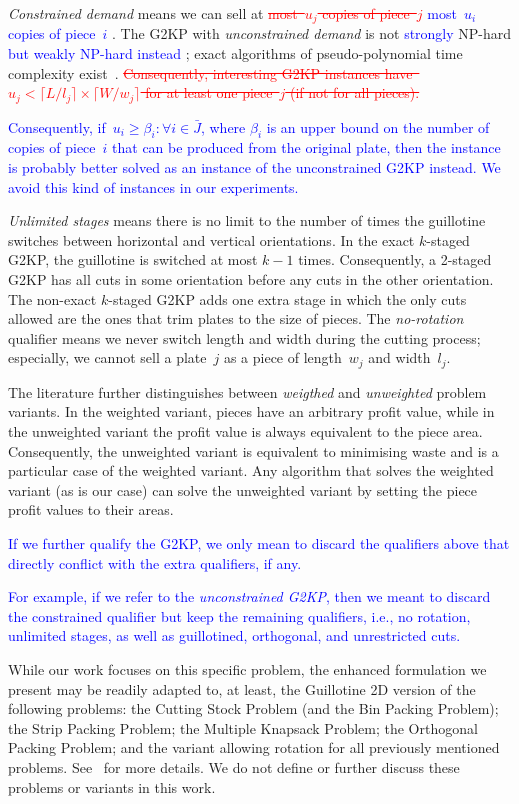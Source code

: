 \documentclass[smallextended]{svjour3}       %
\newif\iffinalversion
\newcommand{\newtext}[1]{\iffinalversion%
#1%
\else%
\textcolor{blue}{#1}%
\fi%
}
\newcommand{\oldtext}[1]{\iffinalversion%
#1%
\else%
\textcolor{red}{\sout{#1}}%
\fi%
}
\begin{document}
\emph{Constrained demand} means we can sell at \oldtext{most~\(u_j\) copies of piece~\(j\)}\newtext{most~\(u_i\) copies of piece~\(i\)}.
The G2KP with \emph{unconstrained demand} is not \newtext{strongly} NP-hard \newtext{but weakly NP-hard instead}; exact algorithms of pseudo-polynomial time complexity exist~\cite{beasley:1985}.
\oldtext{Consequently, interesting G2KP instances have~\(u_j < \lceil L / l_j \rceil \times \lceil W / w_j \rceil \) for at least one piece~\(j\) (if not for all pieces).}
\newtext{Consequently, if~\(u_i \geq \beta_i : \forall i \in \bar{J}\), where \(\beta_i\) is an upper bound on the number of copies of piece~\(i\) that can be produced from the original plate, then the instance is probably better solved as an instance of the unconstrained G2KP instead. We avoid this kind of instances in our experiments.}
\emph{Unlimited stages} means there is no limit to the number of times the guillotine switches between horizontal and vertical orientations.
In the exact \(k\)-staged G2KP, the guillotine is switched at most \(k-1\) times.
Consequently, a 2-staged G2KP has all cuts in some orientation before any cuts in the other orientation.
The non-exact \(k\)-staged G2KP adds one extra stage in which the only cuts allowed are the ones that trim plates to the size of pieces.
The \emph{no-rotation} qualifier means we never switch length and width during the cutting process; especially, we cannot sell a plate~\(j\) as a piece of length~\(w_j\) and width~\(l_j\).

The literature further distinguishes between \emph{weigthed} and \emph{unweighted} problem variants.
In the weighted variant, pieces have an arbitrary profit value, while in the unweighted variant the profit value is always equivalent to the piece area.
Consequently, the unweighted variant is equivalent to minimising waste and is a particular case of the weighted variant.
Any algorithm that solves the weighted variant (as is our case) can solve the unweighted variant by setting the piece profit values to their areas.

\newtext{If we further qualify the G2KP, we only mean to discard the qualifiers above that directly conflict with the extra qualifiers, if any.}
\newtext{For example, if we refer to the \emph{unconstrained G2KP}, then we meant to discard the constrained qualifier but keep the remaining qualifiers, i.e., no rotation, unlimited stages, as well as guillotined, orthogonal, and unrestricted cuts.}

While our work focuses on this specific problem, the enhanced formulation we present may be readily adapted to, at least, the Guillotine 2D version of the following problems: the Cutting Stock Problem (and the Bin Packing Problem); the Strip Packing Problem; the Multiple Knapsack Problem; the Orthogonal Packing Problem; and the variant allowing rotation for all previously mentioned problems.
See~\cite{furini:2016} for more details.
We do not define or further discuss these problems or variants in this work.
\end{document}
